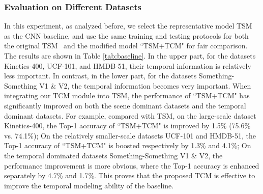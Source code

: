 \documentclass[journal]{IEEEtran}
\begin{document}
\subsubsection{Evaluation on Different Datasets} In this experiment, as analyzed before, we select the representative model TSM~\cite{lin2019tsm} as the CNN baseline, and use the same training and testing protocols for both the original TSM~\cite{lin2019tsm} and the modified model ``TSM+TCM" for fair comparison.
The results are shown in Table \ref{tab:baseline}. In the upper part, for the datasets Kinetics-400, UCF-101, and HMDB-51, their temporal information is relatively less important. In contrast, in the lower part, for the datasets Something-Something V1 \& V2, the temporal information becomes very important. When integrating our TCM module into TSM, the performance of ``TSM+TCM" has significantly improved on both the scene dominant datasets and the temporal dominant datasets. For example, compared with TSM, on the large-scale dataset Kinetics-400, the Top-1 accuracy of ``TSM+TCM" is improved by 1.5\% (75.6\% vs. 74.1\%); On the relatively smaller-scale datasets UCF-101 and HMDB-51, the Top-1 accuracy of ``TSM+TCM" is boosted respectively by 1.3\% and 4.1\%; On the temporal dominated datasets Something-Something V1 \& V2, the performance improvement is more obvious, where the Top-1 accuracy is enhanced separately by 4.7\% and 1.7\%. This proves that the proposed TCM is effective to improve the temporal modeling ability of the baseline.
\end{document}
